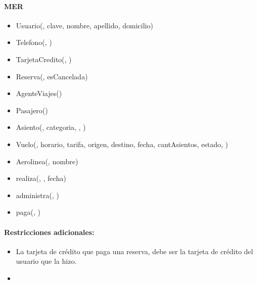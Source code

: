 \begin{multicols}{2}
	\paragraph{MER}
	\begin{itemize}
		\item[] Usuario(, clave, nombre, apellido, domicilio)
		\item[] Telefono(, )
		\item[] TarjetaCredito(, )
		\item[] Reserva(, esCancelada)
		\item[] AgenteViajes()
		\item[] Pasajero()
		\item[] Asiento(, categoria, , )
		\item[] Vuelo(, horario, tarifa, origen, destino, fecha, cantAsientos, estado, )
		\item[] Aerolinea(, nombre)
		\item[] realiza(, , fecha)
		\item[] administra(, )
		\item[] paga(, )
	\end{itemize}
	
	\columnbreak
	\paragraph{Restricciones adicionales:}
	\begin{itemize}
		\item La tarjeta de crédito que paga una reserva, debe ser la tarjeta de crédito del usuario que la hizo.
		\item {}
	\end{itemize}
\end{multicols}
